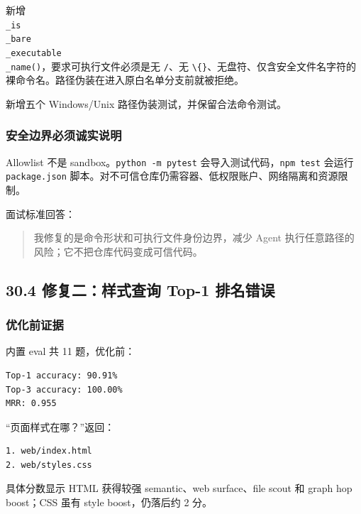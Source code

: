 \documentclass[UTF8,12pt,openany]{ctexbook}
\begin{document}
新增 \texttt{\\_is\\_bare\\_executable\\_name()}，要求可执行文件必须是无 \texttt{/}、无 \texttt{\textbackslash\{\}}、无盘符、仅含安全文件名字符的裸命令名。路径伪装在进入原白名单分支前就被拒绝。\par

新增五个 Windows/Unix 路径伪装测试，并保留合法命令测试。\par

\subsubsection{安全边界必须诚实说明}

Allowlist 不是 sandbox。\texttt{python -m pytest} 会导入测试代码，\texttt{npm test} 会运行 \texttt{package.json} 脚本。对不可信仓库仍需容器、低权限账户、网络隔离和资源限制。\par

面试标准回答：\par

\begin{quote}
我修复的是命令形状和可执行文件身份边界，减少 Agent 执行任意路径的风险；它不把仓库代码变成可信代码。
\end{quote}

\subsection{30.4 修复二：样式查询 Top-1 排名错误}

\subsubsection{优化前证据}

内置 eval 共 11 题，优化前：\par

\begin{lstlisting}
Top-1 accuracy: 90.91%
Top-3 accuracy: 100.00%
MRR: 0.955
\end{lstlisting}

“页面样式在哪？”返回：\par

\begin{lstlisting}
1. web/index.html
2. web/styles.css
\end{lstlisting}

具体分数显示 HTML 获得较强 semantic、web surface、file scout 和 graph hop boost；CSS 虽有 style boost，仍落后约 2 分。\par
\end{document}
